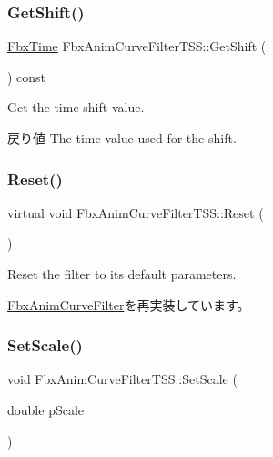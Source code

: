 \subsubsection{\texorpdfstring{Get\+Shift()}{GetShift()}}
{\footnotesize\ttfamily \hyperlink{class_fbx_time}{Fbx\+Time} Fbx\+Anim\+Curve\+Filter\+T\+S\+S\+::\+Get\+Shift (\begin{DoxyParamCaption}{ }\end{DoxyParamCaption}) const}

Get the time shift value. \begin{DoxyReturn}{戻り値}
The time value used for the shift. 
\end{DoxyReturn}
\mbox{\label{class_fbx_anim_curve_filter_t_s_s_aebf5798bd833f7dced2a11aea61b1c35}} 
\subsubsection{\texorpdfstring{Reset()}{Reset()}}
{\footnotesize\ttfamily virtual void Fbx\+Anim\+Curve\+Filter\+T\+S\+S\+::\+Reset (\begin{DoxyParamCaption}{ }\end{DoxyParamCaption})\hspace{0.3cm}{\ttfamily [virtual]}}

Reset the filter to its default parameters. 

\hyperlink{class_fbx_anim_curve_filter_a57fb35baaaa85adb08946383cf40e811}{Fbx\+Anim\+Curve\+Filter}を再実装しています。

\mbox{\label{class_fbx_anim_curve_filter_t_s_s_a0f3661baf7b2511fb6d9a292d19a31dc}} 
\subsubsection{\texorpdfstring{Set\+Scale()}{SetScale()}}
{\footnotesize\ttfamily void Fbx\+Anim\+Curve\+Filter\+T\+S\+S\+::\+Set\+Scale (\begin{DoxyParamCaption}\item[{double}]{p\+Scale }\end{DoxyParamCaption})}

